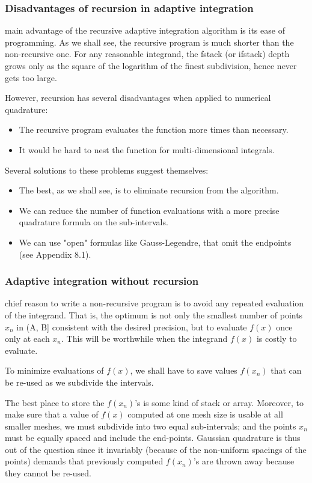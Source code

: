 \subsubsection{Disadvantages of recursion in adaptive integration}
 main advantage of the recursive adaptive integration algorithm is its ease of programming. As we shall see, the recursive program is much shorter than the non-recursive one. For any reasonable integrand, the fstack (or ifstack) depth grows only as the square of the logarithm of the finest subdivision, hence never gets too large.

However, recursion has several disadvantages when applied to numerical quadrature:

\begin{itemize}
    \item The recursive program evaluates the function more times than necessary.
    \item It would be hard to nest the function  for multi-dimensional integrals.
\end{itemize}

Several solutions to these problems suggest themselves:
\begin{itemize}
    \item The best, as we shall see, is to eliminate recursion from the algorithm.
    \item We can reduce the number of function evaluations with a more precise quadrature formula on the sub-intervals.
    \item We can use "open" formulas like Gauss-Legendre, that omit the endpoints (see Appendix 8.1).
\end{itemize}

\subsubsection{Adaptive integration without recursion}
 chief reason to write a non-recursive program is to avoid any repeated evaluation of the integrand. That is, the optimum
is not only the smallest number of points $x_n$ in (A, B] consistent with the desired precision, but to evaluate $f(x)$ once only at each $x_n$. This will be worthwhile when the integrand $f(x)$ is costly to evaluate.

To minimize evaluations of $f(x)$, we shall have to save values $f(x_n)$ that can be re-used as we subdivide the intervals.

The best place to store the $f(x_n)$’s is some kind of stack or array. Moreover, to make sure that a value of $f(x)$ computed at one mesh size is usable at all smaller meshes, we must subdivide into two equal sub-intervals; and the points $x_n$ must be equally spaced and include the end-points. Gaussian quadrature is thus out of the question since it invariably (because of the non-uniform spacings of the points) demands that previously computed $f(x_n)$’s are thrown away because they cannot be re-used.

